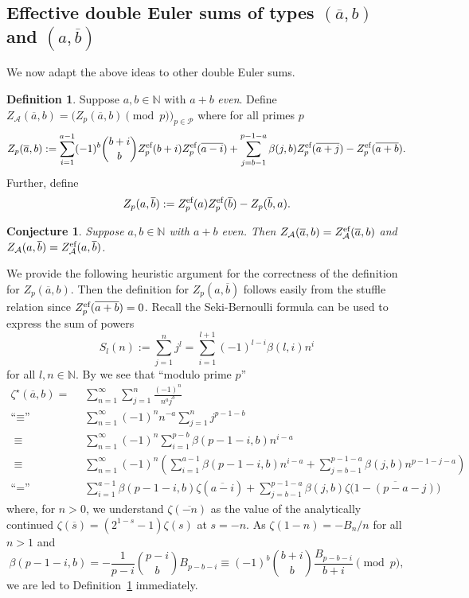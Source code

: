 \documentclass{article}
\newcommand{\fkeqv}{{\text{``$\equiv$''}}}
\newcommand{\fkeq}{{\text{``$=$''}}}
\newcommand{\gb}{\beta}
\newcommand{\calA}{\mathcal{A}}
\newcommand{\calP}{\mathcal{P}}
\newcommand{\eff}{\text{\rm{ef}}}
\newcommand{\N}{\mathbb{N}}
\newcommand{\ol}{\overline}
\theoremstyle{plain}
\newtheorem{conj}[thm]{Conjecture}
\theoremstyle{definition}
\newtheorem{defn}{Definition}[section]
\begin{document}
\subsection{Effective double Euler sums of types $(\ol{a},b)$ and $(a,\ol{b})$}
We now adapt the above ideas to other double Euler sums.

\begin{defn}\label{defn:zBar12}
Suppose $a,b\in\N$ with $a+b$ \emph{even}. Define $Z_\calA(\ol{a},b)=\big(Z_p(\ol{a},b) \pmod{p}\big)_{p\in\calP}$
where for all primes $p$
\begin{equation*}
Z_p(\ol{a},b):=\sum_{i=1}^{a-1} (-1)^b \binom{b+i}{b} Z_p^\eff(b+i)Z_p^\eff(\ol{a-i})  +\sum_{j=b-1}^{p-1-a} \gb(j,b)Z_p^\eff(\ol{a+j})-Z_p^\eff(\ol{a+b}).
\end{equation*}
Further, define
\begin{equation*}
Z_p(a,\ol{b}):= Z_p^\eff(a)Z_p^\eff(\ol{b})-Z_p(\ol{b},a).
\end{equation*}
\end{defn}

\begin{conj} \label{conj:zBar12}
Suppose $a,b\in\N$ with $a+b$ \emph{even}. Then $Z_\calA(\ol{a},b)=Z_\calA^\eff(\ol{a},b)$ and $Z_\calA(a,\ol{b})=Z_\calA^\eff(a,\ol{b})$.
\end{conj}


We provide the following heuristic argument for the correctness of the definition for $Z_p(\ol{a},b)$. Then the definition for $Z_p(a,\ol{b})$ follows easily from the stuffle relation since $Z_p^\eff(\ol{a+b})=0$.
Recall the Seki-Bernoulli formula can be used to express the sum of powers
\begin{equation*}
S_l(n):=\sum_{j=1}^{n} j^l=\sum_{i=1}^{l+1} (-1)^{l-i} \gb(l,i) n^i
\end{equation*}
for all $l,n\in\N$. By \cite[(60)]{KanekoZa2026} we see that ``modulo prime $p$''
\begin{align*}
  \zeta^\star (\ol{a},b) =\phantom{'} &\, \sum_{n=1}^\infty \sum_{j=1}^{n} \frac{(-1)^n}{n^a j^b}\\
 \fkeqv &\, \sum_{n=1}^\infty  (-1)^n n^{-a} \sum_{j=1}^{n}  j^{p-1-b}   \\
  \equiv\phantom{'}&\, \sum_{n=1}^\infty (-1)^n \sum_{i=1}^{p-b} \gb(p-1-i,b) n^{i-a}  \\
  \equiv\phantom{'}&\, \sum_{n=1}^\infty (-1)^n\left( \sum_{i=1}^{a-1} \gb(p-1-i,b) n^{i-a}
  + \sum_{j=b-1}^{p-1-a} \gb(j,b) n^{p-1-j-a}  \right)  \\
  \fkeq &\,  \sum_{i=1}^{a-1} \gb(p-1-i,b) \zeta (\ol{a-i})   + \sum_{j=b-1}^{p-1-a} \gb(j,b) \zeta\big(\ol{1-(p-a-j)}\big)
\end{align*}
where, for $n>0$, we understand $\zeta(\ol{-n})$ as the value of the analytically continued $\zeta(\ol{s})=(2^{1-s}-1)\zeta(s)$ at $s=-n$.
As $\zeta(1-n)=-B_n/n$ for all $n>1$ and
\begin{equation*}
\gb(p-1-i,b)=-\frac{1}{p-i} \binom{p-i}{b} B_{p-b-i}\equiv (-1)^b \binom{b+i}{b} \frac{B_{p-b-i}}{b+i} \pmod{p},
\end{equation*}
we are led to Definition~\ref{defn:zBar12} immediately.
\end{document}
